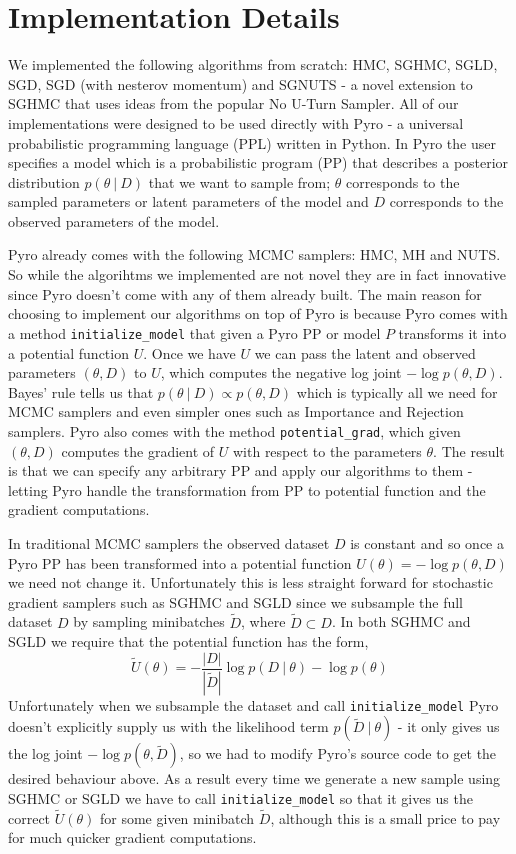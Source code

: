 
\section{Implementation Details}

We implemented the following algorithms from scratch: HMC, SGHMC, SGLD, SGD, SGD (with nesterov momentum) and SGNUTS - a novel extension to SGHMC that uses ideas from the popular No U-Turn Sampler.  All of our implementations were designed to be used directly with Pyro - a universal probabilistic programming language (PPL) written in Python. In Pyro the user specifies a model which is a probabilistic program (PP) that describes a posterior distribution $p(\theta \: | \: D)$ that we want to sample from; $\theta$ corresponds to the sampled parameters or latent parameters of the model and $D$ corresponds to the observed parameters of the model. 

Pyro already comes with the following MCMC samplers: HMC, MH and NUTS. So while the algorihtms we implemented are not novel they are in fact innovative since Pyro doesn't come with any of them already built. The main reason for choosing to implement our algorithms on top of Pyro is because Pyro comes with a method \texttt{initialize\_model} that given a Pyro PP or model $P$ transforms it into a potential function $U$. Once we have $U$ we can pass the latent and observed parameters $(\theta, D)$ to $U$, which computes the negative log joint $- \log p(\theta, D)$. Bayes' rule tells us that  $p(\theta \: | \: D) \propto p(\theta, D)$ which is typically all we need for MCMC samplers and even simpler ones such as Importance and Rejection samplers. Pyro also comes with the method \texttt{potential\_grad}, which given $(\theta, D)$ computes the gradient of $U$ with respect to the parameters $\theta$. The result is that we can specify any arbitrary PP and apply our algorithms to them - letting Pyro handle the transformation from PP to potential function and the gradient computations.

In traditional MCMC samplers the observed dataset $D$ is constant and so once a Pyro PP has been transformed into a potential function $U(\theta) = - \log p(\theta, D)$ we need not change it. Unfortunately this is less straight forward for stochastic gradient samplers such as SGHMC and SGLD since we subsample the full dataset $D$ by sampling minibatches $\tilde{D}$, where $\tilde{D} \subset D$. In both SGHMC and SGLD we require that the potential function has the form,
$$\tilde{U}(\theta) =  -\frac{|D|}{|\tilde{D}|} \log p(D \: | \: \theta) - \log p (\theta)$$
Unfortunately when we subsample the dataset and call \texttt{initialize\_model} Pyro doesn't explicitly supply us with the likelihood term $p(\tilde{D} \: | \: \theta)$ - it only gives us the log joint $- \log p(\theta, \tilde{D})$, so we had to modify Pyro's source code to get the desired behaviour above. As a result every time we generate a new sample using SGHMC or SGLD we have to call \texttt{initialize\_model} so that it gives us the correct $\tilde{U}(\theta)$ for some given minibatch $\tilde{D}$, although this is a small price to pay for much quicker gradient computations.